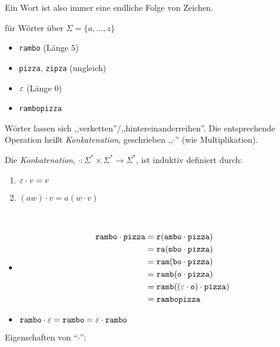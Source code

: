 \goodbreak

Ein Wort ist also immer eine endliche Folge von Zeichen.
\begin{Bsp*} für Wörter über $\Sigma=\{a,\dots,z\}$
  \begin{itemize}
  \item \verb/rambo/ (Länge $5$)
  \item \verb/pizza/, \verb/zipza/ (ungleich) 
  \item $\varepsilon$ (Länge $0$)
  \item \verb/rambopizza/
  \end{itemize}
\end{Bsp*}
Wörter lassen sich ,,verketten''/,,hintereinanderreihen''.
Die entsprechende Operation heißt \emph{Konkatenation}, geschrieben ,,$\cdot$'' (wie Multiplikation).
\begin{Def}
  Die \emph{Konkatenation}, $\mathord{\cdot} : \Sigma^* \times \Sigma^* \to \Sigma^*$, ist induktiv definiert durch:
  \begin{enumerate}
  \item $\varepsilon\cdot v = v$
  \item $(aw)\cdot v = a(w\cdot v)$
  \end{enumerate}
\end{Def}
\begin{Bsp*} ~
  \begin{itemize}
  \item \begin{align*}\mathtt{rambo}\cdot\mathtt{pizza} &=\mathtt{r(ambo}\cdot\mathtt{pizza})\\
                                                        &=\mathtt{ra(mbo}\cdot\mathtt{pizza})\\
                                                        &=\mathtt{ram(bo}\cdot\mathtt{pizza})\\
                                                        &=\mathtt{ramb(o}\cdot\mathtt{pizza})\\
                                                        &=\mathtt{ramb((\varepsilon\cdot o)}\cdot\mathtt{pizza})\\
                                                        &=\mathtt{rambopizza}
        \end{align*}
  \item $\mathtt{rambo} \cdot \varepsilon = \mathtt{rambo} = \varepsilon \cdot \mathtt{rambo}$ 
  \end{itemize}
\end{Bsp*}
Eigenschaften von "`$\cdot$"':
